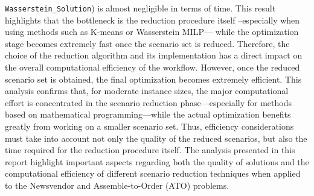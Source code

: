 \documentclass[a4paper,12pt]{article}
\begin{document}
	\texttt{Wasserstein\_Solution}) is almost negligible in terms of time. This result highlights that the bottleneck is the reduction procedure itself --especially when using methods such as K-means or Wasserstein MILP— while the optimization stage becomes extremely fast once the scenario set is reduced. Therefore, the choice of the reduction algorithm and its implementation has a direct impact on the overall computational efficiency of the workflow. However, once the reduced scenario set is obtained, the final optimization becomes extremely efficient. This analysis confirms that, for moderate instance sizes, the major computational effort is concentrated in the scenario reduction phase—especially for methods based on mathematical programming—while the actual optimization benefits greatly from working on a smaller scenario set. Thus, efficiency considerations must take into account not only the quality of the reduced scenarios, but also the time required for the reduction procedure itself. The analysis presented in this report highlight important aspects regarding both the quality of solutions and the computational efficiency of different scenario reduction techniques when applied to the Newsvendor and Assemble-to-Order (ATO) problems.\\
	
\end{document}
